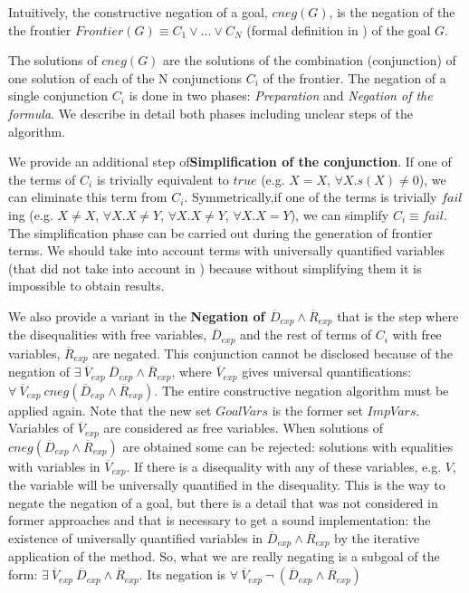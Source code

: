 \documentclass{llncs}
\begin{document}
Intuitively, the constructive negation of a goal, $cneg(G)$, is the
negation of the the frontier $Frontier(G) \equiv C_1 \vee ... \vee
C_N$ (formal definition in \cite{Stuckey95}) of the goal $G$.

The solutions of $cneg(G)$ are the solutions of the combination
(conjunction) of one solution of each of the N conjunctions
$C_i$ of the frontier. 
The negation of a single conjunction $C_i$ is done in two phases:
\emph{Preparation} and \emph{Negation of the formula}. We describe in
detail both phases including unclear steps of the algorithm. 
 
We provide an additional step of{\bf Simplification of the
conjunction}. If one of the terms of $C_i$ is trivially equivalent to
$true$ (e.g. $X=X$, $\forall X. s(X) \neq 0$), we can eliminate this
term from $C_i$. Symmetrically,if one of the terms is trivially
$fail$ing (e.g. $X \neq X$, $\forall X. X \neq Y$, $\forall X. X \neq
Y$, $\forall X. X = Y$), we can simplify $C_i \equiv fail$. The
simplification phase can be carried out during the generation of
frontier terms. We should take into account terms with universally
quantified variables (that did not take into account in
\cite{Chan1,Chan2}) because without simplifying them it is impossible
to obtain results.


We also provide a variant in the {\bf Negation of $\overline{D}_{exp}
           \wedge \overline{R}_{exp}$} that is the step where the
           disequalities with free variables, $\overline{D}_{exp}$ and
           the rest of terms of $C_i$ with free variables,
           $\overline{R}_{exp}$ are negated. This conjunction cannot
           be disclosed because of the negation of $ \exists~
           \overline{V}_{exp}~ \overline{D}_{exp} \wedge
           \overline{R}_{exp}$, where $\overline{V}_{exp}$ gives
           universal quantifications: $\forall~ \overline{V}_{exp}~
           cneg(\overline{D}_{exp} \wedge \overline{R}_{exp})$. The
           entire constructive negation algorithm must be applied
           again. Note that the new set $GoalVars$ is the former set
           $ImpVars$. Variables of $\overline{V}_{exp}$ are considered
           as free variables. When solutions of
           $cneg(\overline{D}_{exp} \wedge \overline{R}_{exp})$ are
           obtained some can be rejected: solutions with equalities
           with variables in $\overline{V}_{exp}$. If there is a
           disequality with any of these variables, e.g. $V$, the
           variable will be universally quantified in the disequality.
           This is the way to negate the negation of a goal, but there
           is a detail that was not considered in former approaches
           and that is necessary to get a sound implementation: the
           existence of universally quantified variables in
           $\overline{D}_{exp} \wedge \overline{R}_{exp}$ by the
           iterative application of the method.  So, what we are
           really negating is a subgoal of the form: $ \exists~
           \overline{V}_{exp}~ \overline{D}_{exp} \wedge
           \overline{R}_{exp}$. Its negation is $\forall~
           \overline{V}_{exp}~ \neg~(\overline{D}_{exp} \wedge
           \overline{R}_{exp})$
\end{document}
